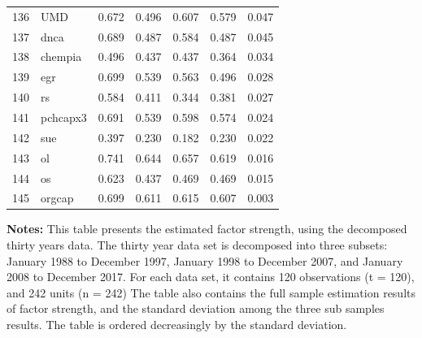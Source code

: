 \begin{footnotesize}
\begin{longtable}{rl|c|c|c|c|c}
		136 & UMD & 0.672 & 0.496 & 0.607 & 0.579 & 0.047 \\ 
		137 & dnca & 0.689 & 0.487 & 0.584 & 0.487 & 0.045 \\ 
		138 & chempia & 0.496 & 0.437 & 0.437 & 0.364 & 0.034 \\ 
		139 & egr & 0.699 & 0.539 & 0.563 & 0.496 & 0.028 \\ 
		140 & rs & 0.584 & 0.411 & 0.344 & 0.381 & 0.027 \\ 
		141 & pchcapx3 & 0.691 & 0.539 & 0.598 & 0.574 & 0.024 \\ 
		142 & sue & 0.397 & 0.230 & 0.182 & 0.230 & 0.022 \\ 
		143 & ol & 0.741 & 0.644 & 0.657 & 0.619 & 0.016 \\ 
		144 & os & 0.623 & 0.437 & 0.469 & 0.469 & 0.015 \\ 
		145 & orgcap & 0.699 & 0.611 & 0.615 & 0.607 & 0.003 \\ 
		\hline
	\end{longtable}
			\begin{minipage}{\textwidth}
	{\footnotesize {\bf Notes:}	This table presents the estimated factor strength, using the decomposed thirty years data.
	The thirty year data set is decomposed into three subsets: January 1988 to December 1997, January 1998 to December 2007, and January 2008 to December 2017. For each data set, it contains 120 observations (t = 120), and 242 units (n = 242)
The table also contains the full sample estimation results of factor strength, and the standard deviation among the three sub samples results.
The table is ordered decreasingly by the standard deviation.}
\end{minipage}
\end{footnotesize}


